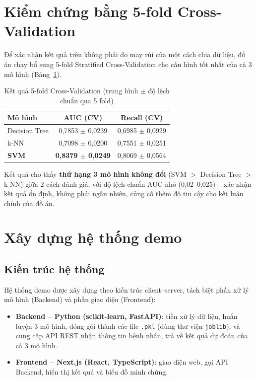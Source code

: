\documentclass[12pt,a4paper]{report}
\begin{document}
\section{Kiểm chứng bằng 5-fold Cross-Validation}

Để xác nhận kết quả trên không phải do may rủi của một cách chia dữ liệu, đồ án chạy bổ sung 5-fold Stratified Cross-Validation cho cấu hình tốt nhất của cả 3 mô hình (Bảng~\ref{tab:cv}).

\begin{table}[H]
\centering
\caption{Kết quả 5-fold Cross-Validation (trung bình $\pm$ độ lệch chuẩn qua 5 fold)}
\label{tab:cv}
\begin{tabular}{lcc}
\toprule
\textbf{Mô hình} & \textbf{AUC (CV)} & \textbf{Recall (CV)} \\
\midrule
Decision Tree & 0,7853 $\pm$ 0,0239 & 0,6985 $\pm$ 0,0929 \\
k-NN & 0,7098 $\pm$ 0,0200 & 0,7551 $\pm$ 0,0251 \\
\textbf{SVM} & \textbf{0,8379 $\pm$ 0,0249} & 0,8069 $\pm$ 0,0564 \\
\bottomrule
\end{tabular}
\end{table}

Kết quả cho thấy \textbf{thứ hạng 3 mô hình không đổi} (SVM $>$ Decision Tree $>$ k-NN) giữa 2 cách đánh giá, với độ lệch chuẩn AUC nhỏ (0,02--0,025) -- xác nhận kết quả ổn định, không phải ngẫu nhiên, củng cố thêm độ tin cậy cho kết luận chính của đồ án.

\section{Xây dựng hệ thống demo}

\subsection{Kiến trúc hệ thống}

Hệ thống demo được xây dựng theo kiến trúc client--server, tách biệt phần xử lý mô hình (Backend) và phần giao diện (Frontend):

\begin{itemize}
    \item \textbf{Backend -- Python (scikit-learn, FastAPI)}: tiền xử lý dữ liệu, huấn luyện 3 mô hình, đóng gói thành các file \texttt{.pkl} (dùng thư viện \texttt{joblib}), và cung cấp API REST nhận thông tin bệnh nhân, trả về kết quả dự đoán của cả 3 mô hình.
    \item \textbf{Frontend -- Next.js (React, TypeScript)}: giao diện web, gọi API Backend, hiển thị kết quả và biểu đồ minh chứng.
\end{itemize}
\end{document}
